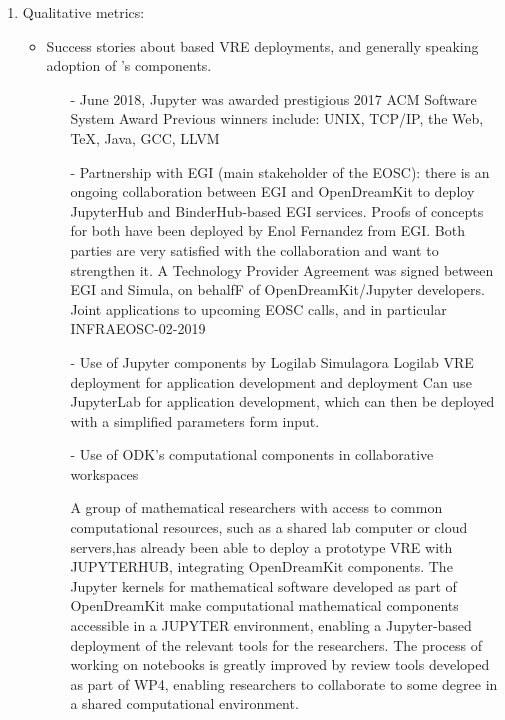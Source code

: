 \begin{enumerate}
\item Qualitative metrics:
\begin{itemize}
\item Success stories about \ODK based VRE deployments, and generally speaking adoption of \ODK's components.
\begin{itemize}
\item[-] June 2018, Jupyter was awarded prestigious 2017 ACM Software System Award
Previous winners include: UNIX, TCP/IP, the Web, TeX, Java, GCC, LLVM

\item[-] Partnership with EGI (main stakeholder of the EOSC): there is an ongoing collaboration between EGI and OpenDreamKit to deploy
JupyterHub and BinderHub-based EGI services. Proofs of concepts for both have been deployed by Enol Fernandez from EGI. Both parties
are very satisfied with the collaboration and want to strengthen it. A Technology Provider Agreement was signed between EGI and
Simula, on behalfF of OpenDreamKit/Jupyter developers. Joint applications to upcoming EOSC calls, and in particular INFRAEOSC-02-2019
  
\item[-] Use of Jupyter components by Logilab
Simulagora
Logilab VRE deployment for application development and deployment
Can use JupyterLab for application development, which can then be deployed with a simplified parameters form input. %

\item [-] Use of ODK's computational components in collaborative workspaces
\begin {description}A group of mathematical researchers with access to common computational resources, such as a shared lab computer or 
cloud servers,has already been able to deploy a prototype VRE with JUPYTERHUB, integrating OpenDreamKit components. The Jupyter kernels for 
mathematical software developed as part of OpenDreamKit make computational mathematical components accessible in a JUPYTER environment, 
enabling a Jupyter-based deployment of the relevant tools for the researchers. The process of working on notebooks is greatly improved by 
review tools developed as part of WP4, enabling researchers to collaborate to some degree in a shared computational environment.
\end{description}


\end{itemize}
\end{itemize}
\end{enumerate}

